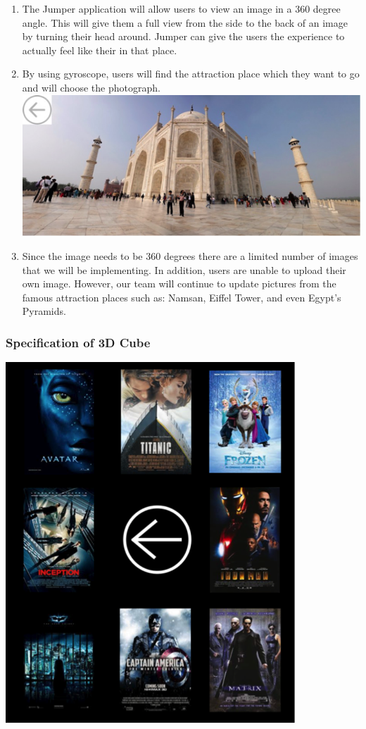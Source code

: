 \documentclass[12pt]{article}
\begin{document}
\begin{enumerate}
\item The Jumper application will allow users to view an image in a 360 degree angle. This will give them a full view from the side to the back of an image by turning their head around. Jumper can give the users the experience to actually feel like their in that place. 
\item By using gyroscope, users will find the attraction place which they want to go and will choose the photograph.\\
\includegraphics{View}
\item Since the image needs to be 360 degrees there are a limited number of images that we will be implementing. In addition, users are unable to upload their own image. However, our team will continue to update pictures from the famous attraction places such as: Namsan, Eiffel Tower, and even Egypt's Pyramids.
\end{enumerate}

\subsubsection{Specification of 3D Cube}
\includegraphics{Cine}
\end{document}

